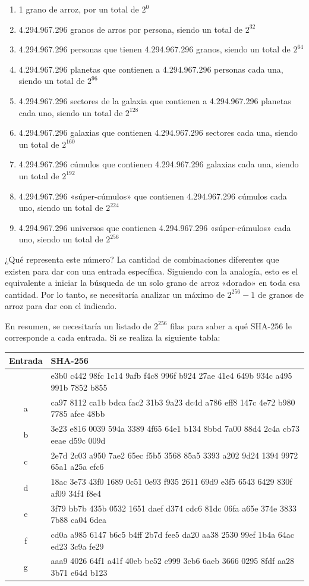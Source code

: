 \documentclass[12pt,a4paper,twoside]{book}
\begin{document}
\begin{enumerate}
\item 1 grano de arroz, por un total de $ 2^{0} $
\item 4.294.967.296 granos de arros por persona, siendo un total de $ 2^{32} $
\item 4.294.967.296 personas que tienen 4.294.967.296 granos, siendo un total de $ 2^{64} $
\item 4.294.967.296 planetas que contienen a 4.294.967.296 personas cada una, siendo un total de $ 2^{96} $
\item 4.294.967.296 sectores de la galaxia que contienen a 4.294.967.296 planetas cada uno, siendo un total de $ 2^{128} $
\item 4.294.967.296 galaxias que contienen 4.294.967.296 sectores cada una, siendo un total de $ 2^{160} $
\item 4.294.967.296 cúmulos que contienen 4.294.967.296 galaxias cada una, siendo un total de $ 2^{192} $
\item 4.294.967.296 «súper-cúmulos» que contienen 4.294.967.296 cúmulos cada uno, siendo un total de $ 2^{224} $
\item 4.294.967.296 universos que contienen 4.294.967.296 «súper-cúmulos» cada uno, siendo un total de $ 2^{256} $
\end{enumerate}

¿Qué representa este número? La cantidad de combinaciones diferentes que existen para dar con una entrada específica. Siguiendo con la analogía, esto es el equivalente a iniciar la búsqueda de un solo grano de arroz «dorado» en toda esa cantidad. Por lo tanto, se necesitaría analizar un máximo de $ 2^{256}-1 $ de granos de arroz para dar con el indicado.

En resumen, se necesitaría un listado de $ 2^{256} $ filas para saber a qué SHA-256 le corresponde a cada entrada. Si se realiza la siguiente tabla:

\begin{longtable}{|c|p{10cm}|}
\hline 
\textbf{Entrada} & \textbf{SHA-256} \\ 
\hline 
 & e3b0 c442 98fc 1c14 9afb f4c8 996f b924 27ae 41e4 649b 934c a495 991b 7852 b855 \\ 
\hline 
a & ca97 8112 ca1b bdca fac2 31b3 9a23 dc4d a786 eff8 147c 4e72 b980 7785 afee 48bb \\ 
\hline 
b & 3e23 e816 0039 594a 3389 4f65 64e1 b134 8bbd 7a00 88d4 2c4a cb73 eeae d59c 009d \\ 
\hline 
c & 2e7d 2c03 a950 7ae2 65ec f5b5 3568 85a5 3393 a202 9d24 1394 9972 65a1 a25a efc6 \\ 
\hline 
d & 18ac 3e73 43f0 1689 0c51 0e93 f935 2611 69d9 e3f5 6543 6429 830f af09 34f4 f8e4  \\ 
\hline 
e & 3f79 bb7b 435b 0532 1651 daef d374 cdc6 81dc 06fa a65e 374e 3833 7b88 ca04 6dea \\ 
\hline 
f & cd0a a985 6147 b6c5 b4ff 2b7d fee5 da20 aa38 2530 99ef 1b4a 64ac ed23 3c9a fe29 \\ 
\hline 
g & aaa9 4026 64f1 a41f 40eb bc52 c999 3eb6 6aeb 3666 0295 8fdf aa28 3b71 e64d b123 \\ 
\hline 
\end{longtable} 
\end{document}
